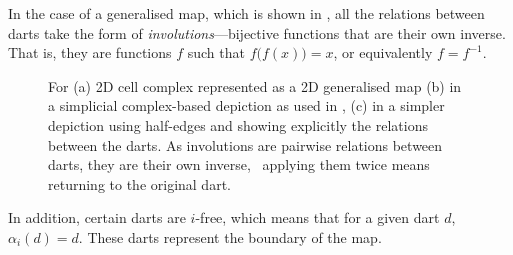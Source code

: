 In the case of a generalised map, which is shown in , all the relations between darts take the form of \emph{involutions}---bijective functions that are their own inverse.
That is, they are functions $f$ such that $f\big(f(x)\big) = x$, or equivalently $f = f^{-1}$.
\begin{figure}[tbp]
\centering
{}
\quad
{}
\quad
{}
\caption[Involutions in a 2D generalised map]{For (a) 2D cell complex represented as a 2D generalised map (b) in a simplicial complex-based depiction as used in , (c) in a simpler depiction using half-edges and showing explicitly the relations between the darts.
As involutions are pairwise relations between darts, they are their own inverse, \ie\ applying them twice means returning to the original dart.}
\label{fig:2dcc}
\end{figure}
In addition, certain darts are $i$-free, which means that for a given dart $d$, $\alpha_i(d) = d$.
These darts represent the boundary of the map.

